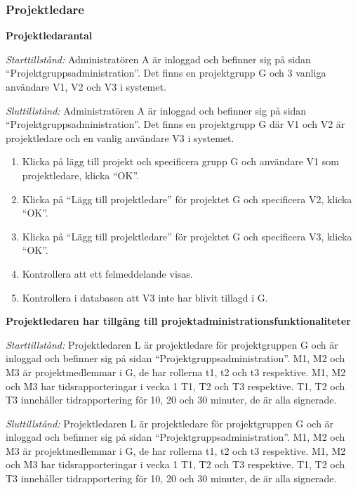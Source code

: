 \documentclass[a4paper]{article}
\begin{document}
\subsubsection{Projektledare}
\begin{FT}
\item \textbf{Projektledarantal}

\emph{Starttillstånd:} Administratören A är inloggad och befinner sig på sidan ``Projektgruppsadministration''. Det finns en projektgrupp G och 3 vanliga användare V1, V2 och V3 i systemet.

\emph{Sluttillstånd:} Administratören A är inloggad och befinner sig på sidan ``Projektgruppsadministration''. Det finns en projektgrupp G där V1 och V2 är projektledare och en vanlig användare V3 i systemet.

\begin{enumerate}
\item Klicka på lägg till projekt och specificera grupp G och användare V1 som projektledare, klicka ``OK''.
\item Klicka på ``Lägg till projektledare'' för projektet G och specificera V2, klicka ``OK''.
\item Klicka på ``Lägg till projektledare'' för projektet G och specificera V3, klicka ``OK''.
\item Kontrollera att ett felmeddelande visas.
\item Kontrollera i databasen att V3 inte har blivit tillagd i G.
\end{enumerate}

\item \textbf{Projektledaren har tillgång till projektadministrationsfunktionaliteter}

\emph{Starttillstånd:} Projektledaren L är projektledare för projektgruppen G och är inloggad och befinner sig på sidan ``Projektgruppsadministration''. M1, M2 och M3 är projektmedlemmar i G, de har rollerna t1, t2 och t3 respektive. M1, M2 och M3 har tidsrapporteringar i vecka 1 T1, T2 och T3 respektive. T1, T2 och T3 innehåller tidrapportering för 10, 20 och 30 minuter, de är alla signerade.

\emph{Sluttillstånd:} Projektledaren L är projektledare för projektgruppen G och är inloggad och befinner sig på sidan ``Projektgruppsadministration''. M1, M2 och M3 är projektmedlemmar i G, de har rollerna t1, t2 och t3 respektive. M1, M2 och M3 har tidsrapporteringar i vecka 1 T1, T2 och T3 respektive. T1, T2 och T3 innehåller tidrapportering för 10, 20 och 30 minuter, de är alla signerade.


\end{FT}
\end{document}
